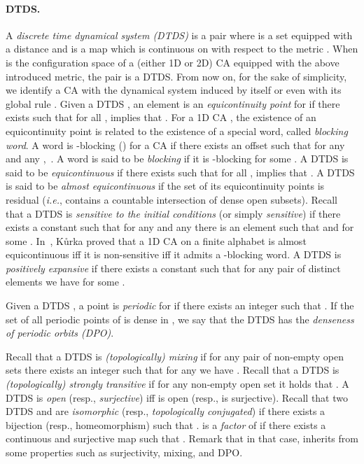 \documentclass{llncs}
\makeatletter
\newcommand{\ie}{\emph{i.e.}\@\xspace}
\newcommand{\ignore}[1]{}
\makeatother
\begin{document}
\paragraph{{\bf DTDS.}} A \emph{discrete time dynamical system (DTDS)}
is a pair  where  is a set equipped with a distance
 and  is a map which is continuous on  with
respect to the metric . When  is the configuration space of
a (either 1D or 2D) CA equipped with the above introduced metric,
the pair  is a DTDS. From now on, for the sake of
simplicity, we identify a CA with the dynamical system induced by
itself or even with its global rule .
Given a DTDS , an element  is
 an \emph{equicontinuity point} for  if 
there exists  such that for all ,
 implies that . For a 1D CA ,
the existence of an equicontinuity point is related to the
existence of a special word, called \emph{blocking word}. A word
 is -blocking () for a CA  if there
exists an offset  such that for any 
and any , \,. A
word  is said to be \emph{blocking} if it is
-blocking for some . 
A DTDS is said to be
\emph{equicontinuous} if  there exists
 such that for all ,
 implies that . \ignore{If  is a compact
set, a DTDS  is equicontinuous iff the set  of all
its equicontinuity points is the whole .} A DTDS is said to be
\emph{almost equicontinuous} if the set  of its equicontinuity points is residual (\ie,  contains a countable intersection of dense open subsets).
Recall that a DTDS  is \emph{sensitive to the initial
conditions} (or simply \emph{sensitive}) if there exists a
constant  such that for any  and any
 there is an element  such that
 and 
for some . In~\cite{kurka97}, K\r{u}rka proved that a 1D CA on a finite alphabet is almost equicontinuous iff it is non-sensitive iff it admits a -blocking word.
A DTDS  is \emph{positively
expansive} if there exists a constant  such that
for any pair of distinct elements  we have
 for some .


Given a DTDS , a point  is \emph{periodic} for
 if there exists an integer  such that . If the
set of all periodic points of  is dense in , we say that the
DTDS has the \emph{denseness of periodic orbits (DPO)}.
\ignore{
Recall that a DTDS  is \emph{(topologically)
transitive} if for any pair of non-empty open sets
 there exists an integer  such that
.}
Recall that a DTDS  is \emph{(topologically) mixing} if 
for any pair of non-empty open sets  there 
exists an integer  such that for any  we have 
. Recall that a DTDS  is \emph{(topologically) strongly transitive} if 
for any non-empty open set  it holds that .
A DTDS  is \emph{open}
(resp., \emph{surjective}) iff   is open (resp.,  is
surjective).
Recall that two DTDS  and 
are \emph{isomorphic} (resp., \emph{topologically conjugated}) if
there exists a bijection (resp., homeomorphism)  such that
.  is
a \emph{factor} of  if  there exists a continuous and
surjective map  such that .
Remark that in that case,  inherits
from  some properties such as surjectivity,
mixing, and DPO.
\end{document}
